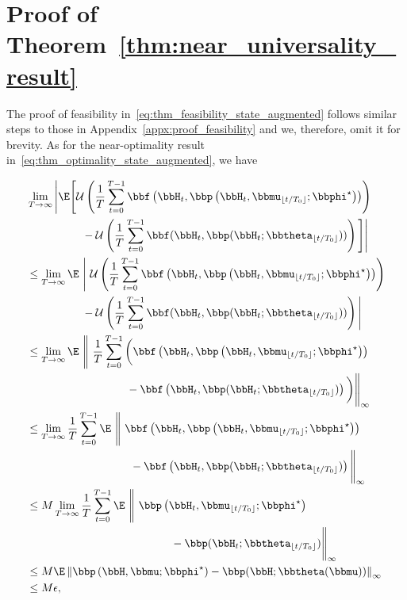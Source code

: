\section{Proof of Theorem~\ref{thm:near_universality_result}}\label{appx:proof_state_augmented}

The proof of feasibility in~\eqref{eq:thm_feasibility_state_augmented} follows similar steps to those in Appendix~\ref{appx:proof_feasibility} and we, therefore, omit it for brevity. As for the near-optimality result in~\eqref{eq:thm_optimality_state_augmented}, we have %

\begin{align}
&\lim_{T\to\infty} \Bigg| \E \Bigg[ \mathcal{U}\left( \frac{1}{T} \sum_{t=0}^{T-1} \bbf\left(\bbH_t, \bbp\left(\bbH_t, \bbmu_{\lfloor t/T_0 \rfloor}; \bbphi^{\star}\right) \right) \right) \nonumber \\
&\quad\qquad\qquad - \mathcal{U}\left( \frac{1}{T} \sum_{t=0}^{T-1} \bbf(\bbH_t, \bbp(\bbH_t ;\bbtheta_{\lfloor t / T_0 \rfloor})) \right) \Bigg] \Bigg| \\
&\leq \lim_{T\to\infty} \E \ \Bigg| \ \mathcal{U}\left( \frac{1}{T} \sum_{t=0}^{T-1} \bbf\left(\bbH_t, \bbp\left(\bbH_t, \bbmu_{\lfloor t/T_0 \rfloor}; \bbphi^{\star}\right) \right) \right) \nonumber \\
&\quad\qquad\qquad - \mathcal{U}\left( \frac{1}{T} \sum_{t=0}^{T-1} \bbf(\bbH_t, \bbp(\bbH_t ;\bbtheta_{\lfloor t / T_0 \rfloor})) \right) \Bigg| \label{eq:convexity_abs} \\
&\leq \lim_{T\to\infty} \E \ \Bigg\| \ \frac{1}{T} \sum_{t=0}^{T-1} \bigg( \bbf\left(\bbH_t, \bbp\left(\bbH_t, \bbmu_{\lfloor t/T_0 \rfloor}; \bbphi^{\star}\right) \right)  \nonumber \\
&\qquad\qquad\qquad\qquad\quad -  \bbf\left(\bbH_t, \bbp(\bbH_t ;\bbtheta_{\lfloor t / T_0 \rfloor})\right) \bigg) \Bigg\|_{\infty} \label{eq:Lipschitz_U} \\
&\leq  \lim_{T\to\infty} \frac{1}{T} \sum_{t=0}^{T-1} \E \ \Bigg\| \   \bbf\left(\bbH_t, \bbp\left(\bbH_t, \bbmu_{\lfloor t/T_0 \rfloor}; \bbphi^{\star}\right) \right)  \nonumber \\
&\qquad\qquad\qquad\qquad\quad ~ -  \bbf\left(\bbH_t, \bbp(\bbH_t ;\bbtheta_{\lfloor t / T_0 \rfloor})\right) \Bigg\|_{\infty} \label{eq:convexity_infnorm} \\
&\leq M \lim_{T\to\infty} \frac{1}{T} \sum_{t=0}^{T-1} \E \ \Bigg\| \   \bbp\left(\bbH_t, \bbmu_{\lfloor t/T_0 \rfloor}; \bbphi^{\star}\right)  \nonumber \\
&\qquad\qquad\qquad\qquad\qquad\qquad\quad -  \bbp(\bbH_t ;\bbtheta_{\lfloor t / T_0 \rfloor})  \Bigg\|_{\infty} \label{eq:Lipschitz_f} \\
&\leq M \E \left\| \bbp\left(\bbH, \bbmu; \bbphi^{\star}\right) - \bbp(\bbH ;\bbtheta(\bbmu))  \right\|_{\infty} \label{eq:exp_mu} \\
&\leq M \epsilon,\label{eq:universality_proofbound}
\end{align}
